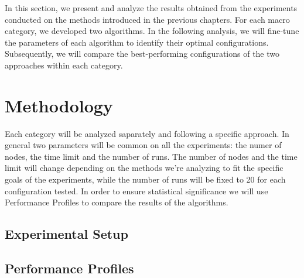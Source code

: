 In this section, we present and analyze the results obtained from the experiments conducted on the methods introduced in the previous chapters. For each macro category, we developed two algorithms. In the following analysis, we will fine-tune the parameters of each algorithm to identify their optimal configurations. Subsequently, we will compare the best-performing configurations of the two approaches within each category.

\section{Methodology}
Each category will be analyzed saparately and following a specific approach. In general two parameters will be common on all the experiments: the numer of nodes, the time limit and the number of runs. The number of nodes and the time limit will change depending on the methods we're analyzing to fit the specific goals of the experiments, while the number of runs will be fixed to 20 for each configuration tested. In order to ensure statistical significance we will use Performance Profiles to compare the results of the algorithms.

\subsection{Experimental Setup}

\subsection{Performance Profiles}
